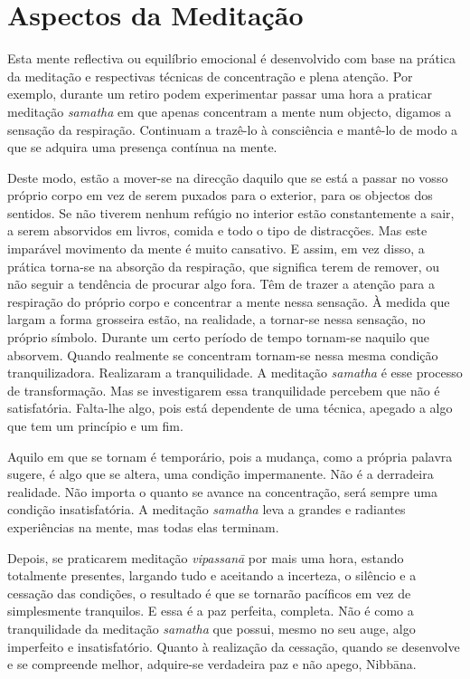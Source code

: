 \section{Aspectos da Meditação}

Esta mente reflectiva ou equilíbrio emocional é desenvolvido com base na prática
da meditação e respectivas técnicas de concentração e plena atenção. Por
exemplo, durante um retiro podem experimentar passar uma hora a praticar
meditação \emph{samatha} em que apenas concentram a mente num objecto, digamos a
sensação da respiração. Continuam a trazê-lo à consciência e mantê-lo de modo a
que se adquira uma presença contínua na mente.

Deste modo, estão a mover-se na direcção daquilo que se está a passar no vosso
próprio corpo em vez de serem puxados para o exterior, para os objectos dos
sentidos. Se não tiverem nenhum refúgio no interior estão constantemente a sair,
a serem absorvidos em livros, comida e todo o tipo de distracções. Mas este
imparável movimento da mente é muito cansativo. E assim, em vez disso, a prática
torna-se na absorção da respiração, que significa terem de remover, ou não
seguir a tendência de procurar algo fora. Têm de trazer a atenção para a
respiração do próprio corpo e concentrar a mente nessa sensação. À medida que
largam a forma grosseira estão, na realidade, a tornar-se nessa sensação, no
próprio símbolo. Durante um certo período de tempo tornam-se naquilo que
absorvem. Quando realmente se concentram tornam-se nessa mesma condição
tranquilizadora. Realizaram a tranquilidade. A meditação \emph{samatha} é esse
processo de transformação. Mas se investigarem essa tranquilidade percebem que
não é satisfatória. Falta-lhe algo, pois está dependente de uma técnica, apegado
a algo que tem um princípio e um fim.

Aquilo em que se tornam é temporário, pois a mudança, como a própria palavra
sugere, é algo que se altera, uma condição impermanente. Não é a derradeira
realidade. Não importa o quanto se avance na concentração, será sempre uma
condição insatisfatória. A meditação \emph{samatha} leva a grandes e radiantes
experiências na mente, mas todas elas terminam.

Depois, se praticarem meditação \emph{vipassanā} por mais uma hora, estando
totalmente presentes, largando tudo e aceitando a incerteza, o silêncio e a
cessação das condições, o resultado é que se tornarão pacíficos em vez de
simplesmente tranquilos. E essa é a paz perfeita, completa. Não é como a
tranquilidade da meditação \emph{samatha} que possui, mesmo no seu auge, algo
imperfeito e insatisfatório. Quanto à realização da cessação, quando se
desenvolve e se compreende melhor, adquire-se verdadeira paz e não apego,
Nibbāna.

